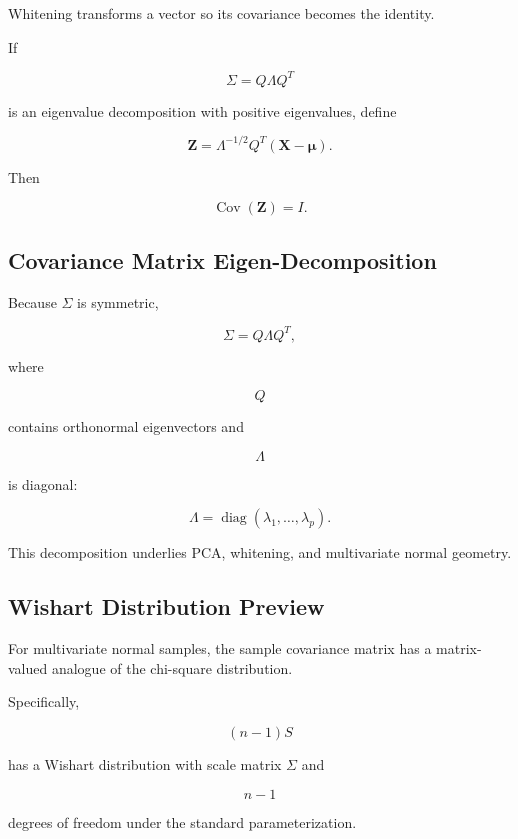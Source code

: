 Whitening transforms a vector so its covariance becomes the identity.

If

\[
\Sigma
=
Q\Lambda Q^T
\]

is an eigenvalue decomposition with positive eigenvalues, define

\[
\boxed{
\mathbf{Z}
=
\Lambda^{-1/2}
Q^T
(
\mathbf{X}-\boldsymbol{\mu}
).
}
\]

Then

\[
\boxed{
\operatorname{Cov}(\mathbf{Z})=I.
}
\]

\subsection{Covariance Matrix Eigen-Decomposition}
\label{subsec:covariance-eigendecomposition}

Because \(\Sigma\) is symmetric,

\[
\boxed{
\Sigma
=
Q\Lambda Q^T,
}
\]

where

\[
Q
\]

contains orthonormal eigenvectors and

\[
\Lambda
\]

is diagonal:

\[
\boxed{
\Lambda
=
\operatorname{diag}
(
\lambda_1,\ldots,\lambda_p
).
}
\]

This decomposition underlies PCA, whitening, and multivariate normal
geometry.

\subsection{Wishart Distribution Preview}
\label{subsec:wishart-preview}

For multivariate normal samples, the sample covariance matrix has a
matrix-valued analogue of the chi-square distribution.

Specifically,

\[
\boxed{
(n-1)S
}
\]

has a Wishart distribution with scale matrix \(\Sigma\) and

\[
n-1
\]

degrees of freedom under the standard parameterization.

